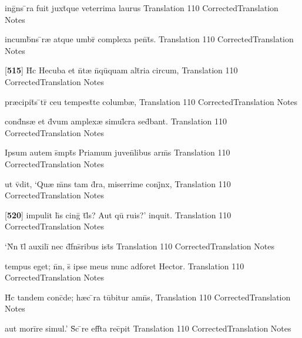\latline
  {ing\={}ns \={}ra fuit juxt\={}que veterrima laurus}
  { Translation }
  {110}
  { CorrectedTranslation }
  { Notes }


\latline
  {incumb\={}ns \={}r{\ae} atque umbr\={} complexa pen\={}t\={\macron {\i}}s.}
  { Translation }
  {110}
  { CorrectedTranslation }
  { Notes }


\latline
  {[\textbf{515}] H\={\macron {\i}}c Hecuba et n\={}t{\ae} n\={}qu\={\macron {\i}}quam alt\={}ria circum,}
  { Translation }
  {110}
  { CorrectedTranslation }
  { Notes }


\latline
  {pr{\ae}cipit\={}s \={}tr\={} ceu tempest\={}te columb{\ae},}
  { Translation }
  {110}
  { CorrectedTranslation }
  { Notes }


\latline
  {cond\={}ns{\ae} et d\={\macron {\i}}vum amplex{\ae} simul\={}cra sed\={}bant.}
  { Translation }
  {110}
  { CorrectedTranslation }
  { Notes }


\latline
  {Ipsum autem s\={}mpt\={\macron {\i}}s Priamum juven\={}libus arm\={\macron {\i}}s}
  { Translation }
  {110}
  { CorrectedTranslation }
  { Notes }


\latline
  {ut v\={\macron {\i}}dit, `Qu{\ae} m\={}ns tam d\={\macron {\i}}ra, miserrime conj\={}nx,}
  { Translation }
  {110}
  { CorrectedTranslation }
  { Notes }


\latline
  {[\textbf{520}] impulit h\={\macron {\i}}s cing\={\macron {\i}} t\={}l\={\macron {\i}}s?  Aut qu\={} ruis?' inquit.}
  { Translation }
  {110}
  { CorrectedTranslation }
  { Notes }


\latline
  {`N\={}n t\={}l\={\macron {\i}} auxili\={} nec d\={}f\={}ns\={}ribus ist\={\macron {\i}}s}
  { Translation }
  {110}
  { CorrectedTranslation }
  { Notes }


\latline
  {tempus eget; n\={}n, s\={\macron {\i}} ipse meus nunc adforet Hector.}
  { Translation }
  {110}
  { CorrectedTranslation }
  { Notes }


\latline
  {H\={}c tandem conc\={}de; h{\ae}c \={}ra tu\={}bitur amn\={\macron {\i}}s,}
  { Translation }
  {110}
  { CorrectedTranslation }
  { Notes }


\latline
  {aut mori\={}re simul.'  S\={\macron {\i}}c \={}re eff\={}ta rec\={}pit}
  { Translation }
  {110}
  { CorrectedTranslation }
  { Notes }


